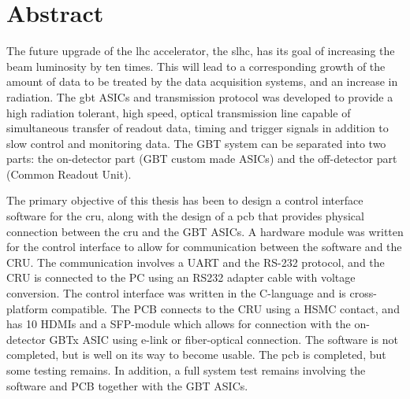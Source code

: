 \documentclass[main.tex]{subfiles}
\begin{document}
\chapter*{Abstract}
%

The future upgrade of the \acrlong{lhc} accelerator, the \acrlong{slhc}, has its goal of increasing the beam luminosity by ten times. This will lead to a corresponding growth of the amount of data to be treated by the data acquisition systems, and an increase in radiation. The \acrlong{gbt} ASICs and transmission protocol was developed to provide a high radiation tolerant, high speed, optical transmission line capable of simultaneous transfer of readout data, timing and trigger signals in addition to slow control and monitoring data. The GBT system can be separated into two parts: the on-detector part (GBT custom made ASICs) and the off-detector part (Common Readout Unit).

The primary objective of this thesis has been to design a control interface software for the \acrshort{cru}, along with the design of a \acrshort{pcb} that provides physical connection between the \acrshort{cru} and the GBT ASICs. A hardware module was written for the control interface to allow for communication between the software and the CRU. The communication involves a UART and the RS-232 protocol, and the CRU is connected to the PC using an RS232 adapter cable with voltage conversion. The control interface was written in the C-language and is cross-platform compatible. The PCB connects to the CRU using a HSMC contact, and has 10 HDMIs and a SFP-module which allows for connection with the on-detector GBTx ASIC using e-link or fiber-optical connection. 
The software is not completed, but is well on its way to become usable. The \acrshort{pcb} is completed, but some testing remains. In addition, a full system test remains involving the software and PCB together with the GBT ASICs.
\end{document}

